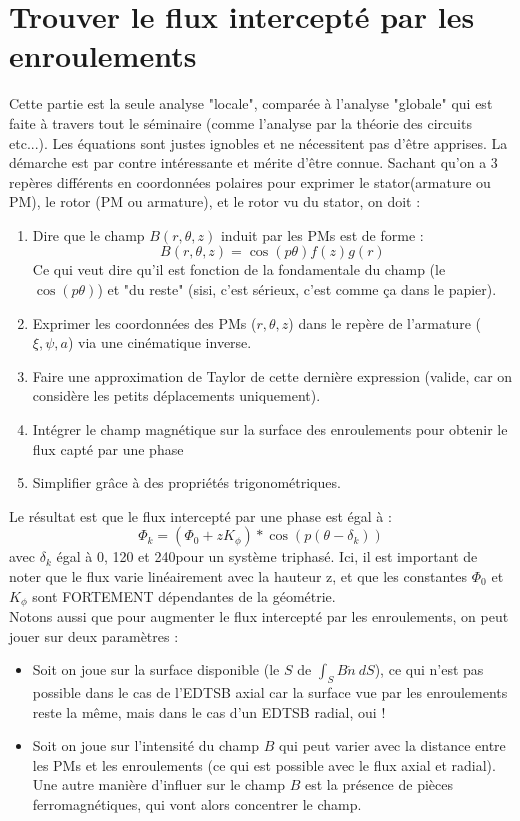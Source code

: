 \section{Trouver le flux intercepté par les enroulements}
Cette partie est la seule analyse "locale", comparée à l'analyse "globale" qui est faite à travers tout le séminaire (comme l'analyse par la théorie des circuits etc...). Les équations sont justes ignobles et ne nécessitent pas d'être apprises. La démarche est par contre intéressante et mérite d'être connue. Sachant qu'on a 3 repères différents en coordonnées polaires pour exprimer le stator(armature ou PM), le rotor (PM ou armature), et le rotor vu du stator, on doit :
\begin{enumerate}
    \item Dire que le champ $B(r,\theta,z)$ induit par les PMs est de forme :
    $$ B(r,\theta,z) = \cos(p\theta)f(z)g(r) $$
    Ce qui veut dire qu'il est fonction de la fondamentale du champ (le $\cos(p\theta)$) et "du reste" (sisi, c'est sérieux, c'est comme ça dans le papier).
    \item Exprimer les coordonnées des PMs ($r,\theta,z$) dans le repère de l'armature ($\xi,\psi,a$) via une cinématique inverse.
    \item Faire une approximation de Taylor de cette dernière expression (valide, car on considère les petits déplacements uniquement).
    \item Intégrer le champ magnétique sur la surface des enroulements pour obtenir le flux capté par une phase
    \item Simplifier grâce à des propriétés trigonométriques.
\end{enumerate}
Le résultat est que le flux intercepté par une phase est égal à :
$$ \Phi_k = (\Phi_0 + zK_{\phi})*\cos(p(\theta - \delta_k)) $$
avec $\delta_k$ égal à 0, 120 et 240\degree pour un système triphasé. Ici, il est important de noter que le flux varie linéairement avec la hauteur z, et que les constantes $\Phi_0$ et $K_{\phi}$ sont FORTEMENT dépendantes de la géométrie.\\
Notons aussi que pour augmenter le flux intercepté par les enroulements, on peut jouer sur deux paramètres :
\begin{itemize}
    \item Soit on joue sur la surface disponible (le $S$ de $\int_S B \dot n \ dS$), ce qui n'est pas possible dans le cas de l'EDTSB axial car la surface vue par les enroulements reste la même, mais dans le cas d'un EDTSB radial, oui !
    \item Soit on joue sur l'intensité du champ $B$ qui peut varier avec la distance entre les PMs et les enroulements (ce qui est possible avec le flux axial et radial). Une autre manière d'influer sur le champ $B$ est la présence de pièces ferromagnétiques, qui vont alors concentrer le champ.
\end{itemize}

